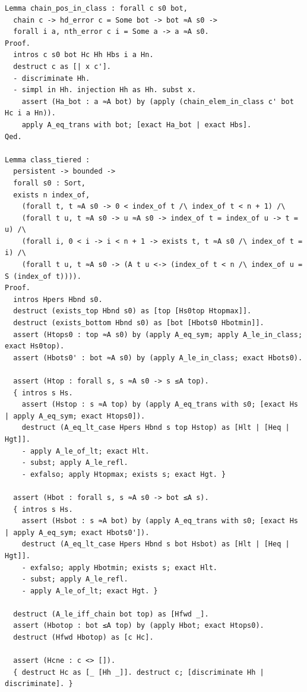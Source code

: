 \begin{latin}
\begin{verbatim}
Lemma chain_pos_in_class : forall c s0 bot,
  chain c -> hd_error c = Some bot -> bot ≈A s0 ->
  forall i a, nth_error c i = Some a -> a ≈A s0.
Proof.
  intros c s0 bot Hc Hh Hbs i a Hn.
  destruct c as [| x c'].
  - discriminate Hh.
  - simpl in Hh. injection Hh as Hh. subst x.
    assert (Ha_bot : a ≈A bot) by (apply (chain_elem_in_class c' bot Hc i a Hn)).
    apply A_eq_trans with bot; [exact Ha_bot | exact Hbs].
Qed.

Lemma class_tiered :
  persistent -> bounded ->
  forall s0 : Sort,
  exists n index_of,
    (forall t, t ≈A s0 -> 0 < index_of t /\ index_of t < n + 1) /\
    (forall t u, t ≈A s0 -> u ≈A s0 -> index_of t = index_of u -> t = u) /\
    (forall i, 0 < i -> i < n + 1 -> exists t, t ≈A s0 /\ index_of t = i) /\
    (forall t u, t ≈A s0 -> (A t u <-> (index_of t < n /\ index_of u = S (index_of t)))).
Proof.
  intros Hpers Hbnd s0.
  destruct (exists_top Hbnd s0) as [top [Hs0top Htopmax]].
  destruct (exists_bottom Hbnd s0) as [bot [Hbots0 Hbotmin]].
  assert (Htops0 : top ≈A s0) by (apply A_eq_sym; apply A_le_in_class; exact Hs0top).
  assert (Hbots0' : bot ≈A s0) by (apply A_le_in_class; exact Hbots0).

  assert (Htop : forall s, s ≈A s0 -> s ≤A top).
  { intros s Hs.
    assert (Hstop : s ≈A top) by (apply A_eq_trans with s0; [exact Hs | apply A_eq_sym; exact Htops0]).
    destruct (A_eq_lt_case Hpers Hbnd s top Hstop) as [Hlt | [Heq | Hgt]].
    - apply A_le_of_lt; exact Hlt.
    - subst; apply A_le_refl.
    - exfalso; apply Htopmax; exists s; exact Hgt. }

  assert (Hbot : forall s, s ≈A s0 -> bot ≤A s).
  { intros s Hs.
    assert (Hsbot : s ≈A bot) by (apply A_eq_trans with s0; [exact Hs | apply A_eq_sym; exact Hbots0']).
    destruct (A_eq_lt_case Hpers Hbnd s bot Hsbot) as [Hlt | [Heq | Hgt]].
    - exfalso; apply Hbotmin; exists s; exact Hlt.
    - subst; apply A_le_refl.
    - apply A_le_of_lt; exact Hgt. }

  destruct (A_le_iff_chain bot top) as [Hfwd _].
  assert (Hbotop : bot ≤A top) by (apply Hbot; exact Htops0).
  destruct (Hfwd Hbotop) as [c Hc].

  assert (Hcne : c <> []).
  { destruct Hc as [_ [Hh _]]. destruct c; [discriminate Hh | discriminate]. }


\end{verbatim}
\end{latin}
